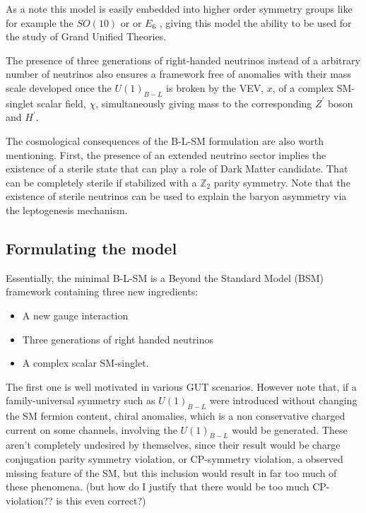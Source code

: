 As a note this model is easily embedded into higher order symmetry groups like for example the $SO(10)$ or  or $E_6$ , giving this model the ability to be used for the study of Grand Unified Theories.  

The presence of three generations of right-handed neutrinos instead of a arbitrary number of neutrinos also ensures a framework free of anomalies with their mass scale developed once the $U(1)_{B-L}$ is broken by the VEV, $x$, of a complex SM-singlet scalar field, $\chi$, simultaneously giving mass to the corresponding $Z^\prime$ boson and $H^\prime$.
  
The cosmological consequences of the B-L-SM formulation are also worth mentioning.  First, the presence of an extended neutrino sector implies the existence of a sterile state that can play a role of Dark Matter candidate. That can be completely sterile if stabilized with a $\mathbb{Z}_2$ parity symmetry. Note that the existence of sterile neutrinos can be used to explain the baryon asymmetry via the leptogenesis mechanism. 

\subsection{Formulating the model}

Essentially, the minimal B-L-SM is a Beyond the Standard Model (BSM) framework containing three new ingredients: 

\begin{itemize}
  \item A new gauge interaction
  \item Three generations of right handed neutrinos  
  \item A complex scalar SM-singlet.
\end{itemize}

The first one is well motivated in various GUT scenarios. However note that, if a family-universal symmetry such as $U(1)_{B-L}$ were introduced without changing the SM fermion content, chiral anomalies, which is a non conservative charged current on some channels, involving the $U(1)_{B-L}$ would be generated. These aren't completely undesired by themselves, since their result would be charge conjugation parity symmetry violation, or CP-symmetry violation, a observed missing feature of the SM, but this inclusion would result in far too much of these phenomena. {  \color{red}  (but how do I justify that there would be too much CP-violation?? is this even correct?) }


